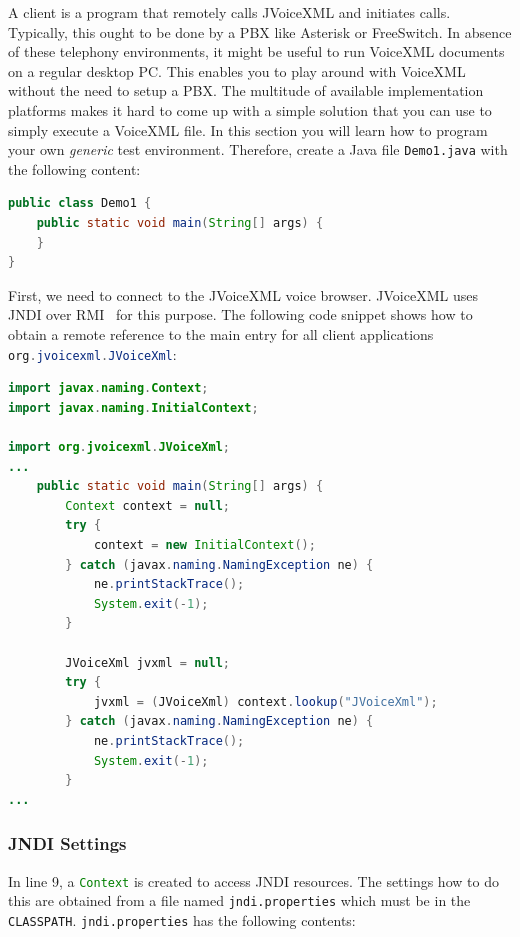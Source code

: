 \documentclass[11pt,a4paper]{book}
\begin{document}
A client is a program that remotely calls JVoiceXML and initiates calls.
Typically, this ought to be done by a PBX like Asterisk or FreeSwitch. In
absence of these telephony environments, it might be useful to run
VoiceXML documents on a regular desktop PC. This enables you to play around with
VoiceXML without the need to setup a PBX. The multitude of available
implementation platforms makes it hard to come up with a simple solution that
you can use to simply execute a VoiceXML file. In this section you will learn
how to program your own \emph{generic} test environment. Therefore, create a
Java file \texttt{Demo1.java} with the following content:

\begin{lstlisting}[language=Java]
public class Demo1 {
    public static void main(String[] args) {
    }
}
\end{lstlisting}

First, we need to connect to the JVoiceXML voice browser. JVoiceXML
uses JNDI over RMI~\cite{sun:rmi,sun:rmi_jndi} for this purpose. 
The following code snippet
shows how to obtain a remote reference to the main entry for
all client applications \lstinline[language=Java]{org.jvoicexml.JVoiceXml}:

\begin{lstlisting}[language=Java]
import javax.naming.Context;
import javax.naming.InitialContext;

import org.jvoicexml.JVoiceXml;
...
    public static void main(String[] args) {
        Context context = null;
        try {
            context = new InitialContext();
        } catch (javax.naming.NamingException ne) {
            ne.printStackTrace();
            System.exit(-1);
        }

        JVoiceXml jvxml = null;
        try {
            jvxml = (JVoiceXml) context.lookup("JVoiceXml");
        } catch (javax.naming.NamingException ne) {
            ne.printStackTrace();
            System.exit(-1);
        }
...
\end{lstlisting}

\subsubsection{JNDI Settings}

In line 9, a \lstinline[language=Java]{Context} is created to access JNDI resources.
The settings how to do this are obtained from a file named
\texttt{jndi.properties} which must be in the \texttt{CLASSPATH}.
\texttt{jndi.properties} has the following contents:
\end{document}
